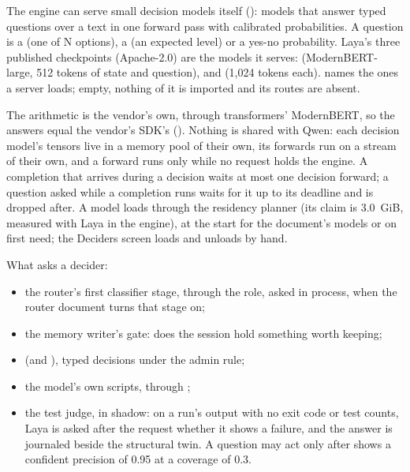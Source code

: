 The engine can serve small decision models itself (): models that answer typed questions over a text in one forward pass with calibrated probabilities. A question is a  (one of N options), a  (an expected level) or a yes-no probability. Laya's three published checkpoints (Apache-2.0) are the models it serves:  (ModernBERT-large, 512 tokens of state and question),  and  (1,024 tokens each).  names the ones a server loads; empty, nothing of it is imported and its routes are absent.

The arithmetic is the vendor's own, through transformers' ModernBERT, so the answers equal the vendor's SDK's (). Nothing is shared with Qwen: each decision model's tensors live in a memory pool of their own, its forwards run on a stream of their own, and a forward runs only while no request holds the engine. A completion that arrives during a decision waits at most one decision forward; a question asked while a completion runs waits for it up to its deadline and is dropped after. A model loads through the residency planner (its claim is 3.0~GiB, measured with Laya in the engine), at the start for the  document's  models or on first need; the Deciders screen loads and unloads by hand.

What asks a decider:

\begin{itemize}
\item the router's first classifier stage, through the  role, asked in process, when the router document turns that stage on;
\item the memory writer's gate: does the session hold something worth keeping;
\item {} (and ), typed decisions under the admin rule;
\item the model's own scripts, through ;
\item the test judge, in shadow: on a run's output with no exit code or test counts, Laya is asked after the request whether it shows a failure, and the answer is journaled beside the structural twin. A question may act only after  shows a confident precision of 0.95 at a coverage of 0.3.
\end{itemize}

